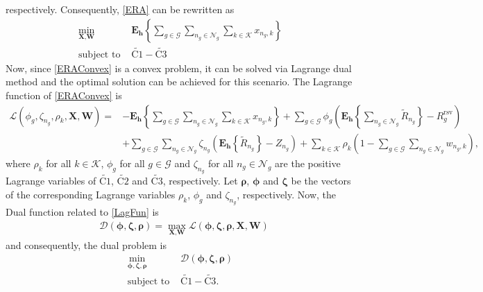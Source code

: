 \documentclass[journal,draftclsnofoot,12pt,onecolumn]{IEEEtran}
\begin{document}
respectively. Consequently, \eqref{ERA} can be rewritten as
\begin{align}\label{ERAConvex}
\min\limits_{\textbf{X},\textbf{W}}~ &\textbf{E}_{\textbf{h}}\left\lbrace \sum\limits_{g \in \mathcal{G}}\sum\limits_{n_g \in \mathcal{N}_g}\sum\limits_{k \in \mathcal{K}}x_{n_g,k}\right\rbrace \\
\text{subject to }&\widetilde{\text{C1}} - \widetilde{\text{C3}}\nonumber
\end{align}
Now, since \eqref{ERAConvex} is a convex problem, it can be solved via Lagrange dual method \cite{boyd2004convex,5895104} and the optimal solution can be achieved for this scenario. The Lagrange function of \eqref{ERAConvex} is
\begin{align}\label{LagFun}
\mathcal{L}(\phi_g,\zeta_{n_g},\rho_{k},\textbf{X},\textbf{W}) = &-\textbf{E}_{\textbf{h}}\left\lbrace \sum\limits_{g \in \mathcal{G}}\sum\limits_{n_g \in \mathcal{N}_g}\sum\limits_{k \in \mathcal{K}}x_{n_g,k}\right\rbrace  + \sum\limits_{g\in \mathcal{G}}\phi_g( \textbf{E}_{\textbf{h}}\left\lbrace \sum\limits_{n_g \in \mathcal{N}_g}\widetilde{R}_{n_g}\right\rbrace   - R_g^\text{rsv} ) \\
& + \sum\limits_{g \in \mathcal{G}}\sum\limits_{n_g \in \mathcal{N}_g}\zeta_{n_g}(\textbf{E}_{\textbf{h}}\left\lbrace  \widetilde{R}_{n_g}\right\rbrace - Z_{n_g}) + \sum\limits_{k \in \mathcal{K}}\rho_k\left(1- \sum\limits_{g\in \mathcal{G}}\sum\limits_{n_g \in \mathcal{N}_g}w_{n_g,k} \right) ,\nonumber
\end{align}
where $\rho_k$ for all $k\in \mathcal{K}$, $\phi_g$ for all $g \in \mathcal{G}$ and $\zeta_{n_g}$ for all $n_g \in \mathcal{N}_g$ are the positive Lagrange variables of $\widetilde{\text{C1}}$, $\widetilde{\text{C2}}$ and $\widetilde{\text{C3}}$, respectively. Let $\boldsymbol{\rho}$, $\boldsymbol{\phi}$ and $\boldsymbol{\zeta}$ be the vectors of the corresponding Lagrange variables $\rho_k$, $\phi_g$ and $\zeta_{n_g}$, respectively. Now, the Dual function related to \eqref{LagFun} is
\begin{align}
&\mathcal{D}(\boldsymbol{\phi},\boldsymbol{\zeta},\boldsymbol{\rho}) = \max\limits_{\textbf{X},\textbf{W}} \mathcal{L}(\boldsymbol{\phi},\boldsymbol{\zeta},\boldsymbol{\rho},\textbf{X},\textbf{W}) \nonumber
\end{align}
and consequently, the dual problem is
\begin{align}\label{Dual}
\min\limits_{\boldsymbol{\phi},\boldsymbol{\zeta},\boldsymbol{\rho}}~ &\mathcal{D}(\boldsymbol{\phi},\boldsymbol{\zeta},\boldsymbol{\rho})\\
\text{subject to }&\widetilde{\text{C1}} - \widetilde{\text{C3}}.\nonumber
\end{align}
\end{document}
